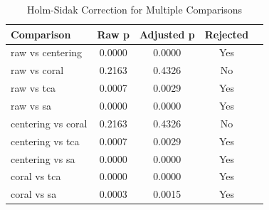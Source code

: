 \begin{table}[htbp]
\centering
\caption{Holm-Sidak Correction for Multiple Comparisons}
\label{tab:holmsidak}
\begin{tabular}{lcccc}
\toprule
Comparison & Raw p & Adjusted p & Rejected \\
\midrule
raw vs centering & 0.0000 & 0.0000 & Yes \\
raw vs coral & 0.2163 & 0.4326 & No \\
raw vs tca & 0.0007 & 0.0029 & Yes \\
raw vs sa & 0.0000 & 0.0000 & Yes \\
centering vs coral & 0.2163 & 0.4326 & No \\
centering vs tca & 0.0007 & 0.0029 & Yes \\
centering vs sa & 0.0000 & 0.0000 & Yes \\
coral vs tca & 0.0000 & 0.0000 & Yes \\
coral vs sa & 0.0003 & 0.0015 & Yes \\
\bottomrule
\end{tabular}
\end{table}